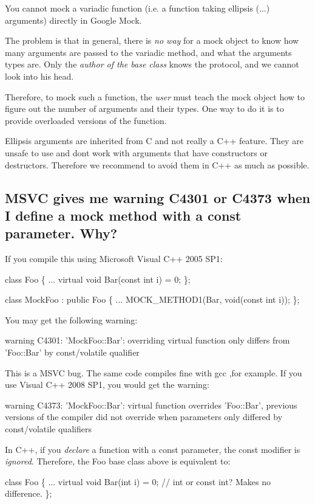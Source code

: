 You cannot mock a variadic function (i.\+e. a function taking ellipsis ({\ttfamily ...}) arguments) directly in Google Mock.

The problem is that in general, there is {\itshape no way} for a mock object to know how many arguments are passed to the variadic method, and what the arguments\textquotesingle{} types are. Only the {\itshape author of the base class} knows the protocol, and we cannot look into his head.

Therefore, to mock such a function, the {\itshape user} must teach the mock object how to figure out the number of arguments and their types. One way to do it is to provide overloaded versions of the function.

Ellipsis arguments are inherited from C and not really a C++ feature. They are unsafe to use and don\textquotesingle{}t work with arguments that have constructors or destructors. Therefore we recommend to avoid them in C++ as much as possible.

\subsection*{M\+S\+VC gives me warning C4301 or C4373 when I define a mock method with a const parameter. Why?}

If you compile this using Microsoft Visual C++ 2005 S\+P1\+: 
\begin{DoxyCode}
class Foo \{
  ...
  virtual void Bar(const int i) = 0;
\};

class MockFoo : public Foo \{
  ...
  MOCK\_METHOD1(Bar, void(const int i));
\};
\end{DoxyCode}
 You may get the following warning\+: 
\begin{DoxyCode}
warning C4301: 'MockFoo::Bar': overriding virtual function only differs from 'Foo::Bar' by const/volatile
       qualifier
\end{DoxyCode}


This is a M\+S\+VC bug. The same code compiles fine with gcc ,for example. If you use Visual C++ 2008 S\+P1, you would get the warning\+: 
\begin{DoxyCode}
warning C4373: 'MockFoo::Bar': virtual function overrides 'Foo::Bar', previous versions of the compiler did
       not override when parameters only differed by const/volatile qualifiers
\end{DoxyCode}


In C++, if you {\itshape declare} a function with a {\ttfamily const} parameter, the {\ttfamily const} modifier is {\itshape ignored}. Therefore, the {\ttfamily Foo} base class above is equivalent to\+: 
\begin{DoxyCode}
class Foo \{
  ...
  virtual void Bar(int i) = 0;  // int or const int?  Makes no difference.
\};
\end{DoxyCode}


